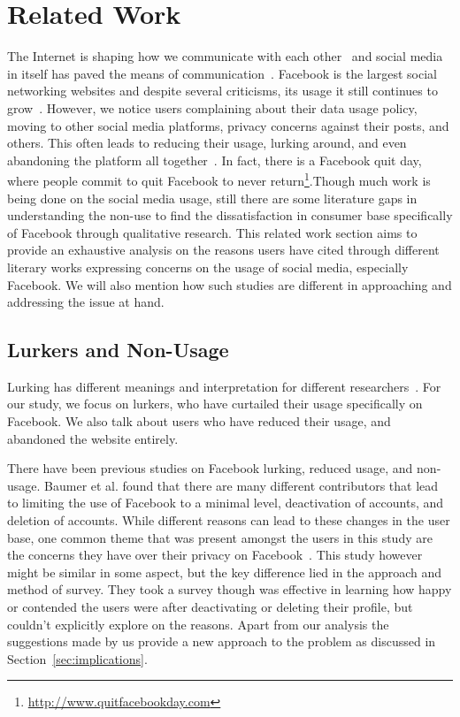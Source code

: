 \section{Related Work}
\label{sec:relatedwork}

The Internet is shaping how we communicate with each other~\cite{wellman2003social} and social media in itself has paved the means of communication~\cite{bijker2012social}. Facebook is the largest social networking websites and despite several criticisms, its usage it still continues to grow~\cite{joinson2008looking}. However, we notice users complaining about their data usage policy, moving to other social media platforms, privacy concerns against their posts, and others. This often leads to reducing their usage, lurking around, and even abandoning the platform all together~\cite{wyatt2003non,karppi2011digital,gillette2015facebook}. In fact, there is a Facebook quit day, where people commit to quit Facebook to never return\footnote{\url{http://www.quitfacebookday.com}}.Though much work is being done on the social media usage, still there are some literature gaps in understanding the non-use to find the dissatisfaction in consumer base specifically of Facebook through qualitative research. This related work section aims to provide an exhaustive analysis on the reasons users have cited through different literary works expressing concerns on the usage of social media, especially Facebook. We will also mention how such studies are different in approaching and addressing the issue at hand.
\subsection{Lurkers and Non-Usage}
Lurking has different meanings and interpretation for different researchers~\cite{crawford2009following,schultz2004lurkers}. For our study, we focus on lurkers, who have curtailed their usage specifically on Facebook. We also talk about users who have reduced their usage, and abandoned the website entirely.

There have been previous studies on Facebook lurking, reduced usage, and non-usage. Baumer et al. found that there are many different contributors that lead to limiting the use of Facebook to a minimal level, deactivation of accounts, and deletion of accounts. While different reasons can lead to these changes in the user base, one common theme that was present amongst the users in this study are the concerns they have over their privacy on Facebook~\cite{baumer2013limiting}. This study however might be similar in some aspect, but the key difference lied in the approach and method of survey. They took a survey though was effective in learning how happy or contended the users were after deactivating or deleting their profile, but couldn't explicitly explore on the reasons. Apart from our analysis the suggestions made by us provide a new approach to the problem as discussed in Section~\ref{sec:implications}.

